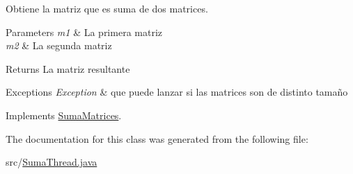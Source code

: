 Obtiene la matriz que es suma de dos matrices. 


\begin{DoxyParams}{Parameters}
{\em m1} & La primera matriz \\
\hline
{\em m2} & La segunda matriz \\
\hline
\end{DoxyParams}
\begin{DoxyReturn}{Returns}
La matriz resultante 
\end{DoxyReturn}

\begin{DoxyExceptions}{Exceptions}
{\em Exception} & que puede lanzar si las matrices son de distinto tamaño \\
\hline
\end{DoxyExceptions}


Implements \hyperlink{interfaceSumaMatrices_aaa4f45720c4f880570897a307d78c60d}{Suma\-Matrices}.



The documentation for this class was generated from the following file\-:\begin{DoxyCompactItemize}
\item 
src/\hyperlink{SumaThread_8java}{Suma\-Thread.\-java}\end{DoxyCompactItemize}

